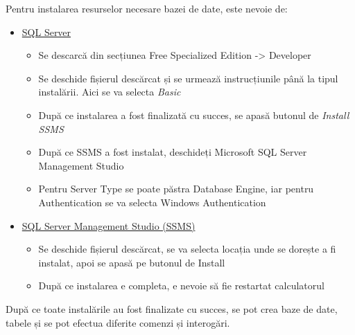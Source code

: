 \noindent Pentru instalarea resurselor necesare bazei de date, este nevoie de:
\begin{itemize}
    \setlength\itemsep{0.5em}
    \item \href{https://www.microsoft.com/en-us/sql-server/sql-server-downloads}{\color{blue}SQL Server}
    \begin{itemize}
        \setlength\itemsep{0.5em}
        \item Se descarcă din secțiunea Free Specialized Edition -> Developer
        \item Se deschide fișierul descărcat și se urmează instrucțiunile până la tipul instalării. Aici se va selecta {\it Basic}
        \item După ce instalarea a fost finalizată cu succes, se apasă butonul de {\it Install SSMS} 
        \item După ce SSMS a fost instalat, deschideți Microsoft SQL Server Management Studio
        \item Pentru Server Type se poate păstra Database Engine, iar pentru Authentication se va selecta Windows Authentication
    \end{itemize}

    \item \href{https://docs.microsoft.com/en-us/sql/ssms/download-sql-server-management-studio-ssms?view=sql-server-ver16}{\color{blue}SQL Server Management Studio (SSMS)}
    \begin{itemize}
        \setlength\itemsep{0.5em}
        \item Se deschide fișierul descărcat, se va selecta locația unde se dorește a fi instalat, apoi se apasă pe butonul de Install
        \item După ce instalarea e completa, e nevoie să fie restartat calculatorul 
    \end{itemize}
\end{itemize}

După ce toate instalările au fost finalizate cu succes, se pot crea baze de date, tabele și se pot efectua diferite comenzi și interogări.
